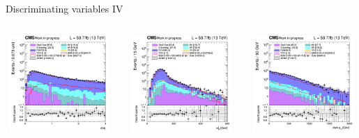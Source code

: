 \documentclass[8pt]{beamer}
\begin{document}
\begin{frame}{Discriminating variables IV}
\begin{columns}
\begin{column}{0.33\textwidth}
\begin{center}
    		\end{center}		
		\end{column}
\end{columns}
\vspace{-5pt}
\begin{columns}
		\begin{column}{0.33\textwidth}
			\begin{center}
     			\includegraphics[width=1.0\textwidth, height=105pt]{figs/2018/SmearSR-ttDM-scalar100/log_cratio_topCR_ll_r2l4j.png}
    		\end{center}		
		\end{column}
		\begin{column}{0.33\textwidth}
			\begin{center}
     			\includegraphics[width=1.0\textwidth, height=105pt]{figs/2018/SmearSR-ttDM-scalar100/log_cratio_topCR_ll_mblt.png}
    		\end{center}		
		\end{column}
		\begin{column}{0.33\textwidth}
			\begin{center}
     			\includegraphics[width=1.0\textwidth, height=105pt]{figs/2018/SmearSR-ttDM-scalar100/log_cratio_topCR_ll_dark_pt.png}
    		\end{center}		
		\end{column}
\end{columns} \vfill
\end{frame}
\end{document}
